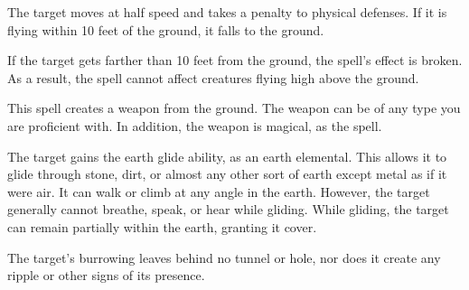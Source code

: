 \begin{comment}
\subsubsection{E}
\end{comment}

\begin{spellheader}
    \spellrng{\rngmed}
    \spelldur{\durshort}
\end{spellheader}
\begin{spelleffects}
    \spelleffect The target moves at half speed and takes a  penalty to physical defenses. If it is flying within 10 feet of the ground, it falls to the ground.
\end{spelleffects}
\begin{spellfooter}
    \spellnotes If the target gets farther than 10 feet from the ground, the spell's effect is broken. As a result, the spell cannot affect creatures flying high above the ground.
\end{spellfooter}

\begin{spellheader}
    \spelldur{\durlong \dismissable}
\end{spellheader}
\begin{spelleffects}
    \spelleffect This spell creates a weapon from the ground. The weapon can be of any type you are proficient with. In addition, the weapon is magical, as the  spell.
\end{spelleffects}
\begin{spellfooter}

\end{spellfooter}

\begin{spellheader}
    \spelldur{\durshort}
\end{spellheader}
\begin{spelleffects}
    \spelleffect The target gains the earth glide ability, as an earth elemental. This allows it to glide through stone, dirt, or almost any other sort of earth except metal  as if it were air. It can walk or climb at any angle in the earth. However, the target generally cannot breathe, speak, or hear while gliding. While gliding, the target can remain partially within the earth, granting it cover.
\end{spelleffects}
\begin{spellfooter}
    \spellnotes The target's burrowing leaves behind no tunnel or hole, nor does it create any ripple or other signs of its presence.
\end{spellfooter}

